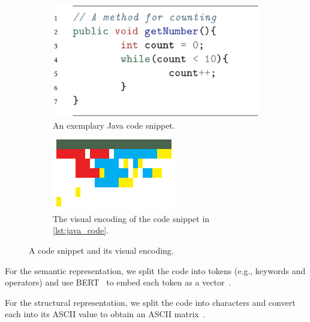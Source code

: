 \documentclass[%
class=scrreprt,
chapterprefix=false,%
open=right,%
twoside=true,%
paper=a4,%
logofile={Logo\_zentral\_farbig\_EN.png},%
thesistype=master,%
UKenglish,%
]{se2thesis}
\theoremstyle{definition}
\begin{document}
	\begin{figure}
		\begin{subfigure}[t]{0.48\textwidth}
			\centering
			\includegraphics[width=\textwidth]{img/visual_encoding_code.png}
			\caption{An exemplary Java code snippet.}
			\label{lst:java_code}
		\end{subfigure}
		\begin{subfigure}[t]{0.48\textwidth}
			\centering
			\includegraphics[width=\textwidth]{img/visual_encoding.png}
			\caption{The visual encoding of the code snippet in \autoref{lst:java_code}.}
			\label{fig:visual_encoding}
		\end{subfigure}
		\caption{A code snippet and its visual encoding.}
		\label{fig:visual_encoding_combined}
	\end{figure}
	
	For the semantic representation, we split the code into tokens (e.g., keywords and operators) and use BERT~\cite{devlin2018bert} to embed each token as a vector~\cite{mi2022towards}.
	
	For the structural representation, we split the code into characters and convert each into its ASCII value to obtain an ASCII matrix~\cite{mi2022towards}.
	
\end{document}
